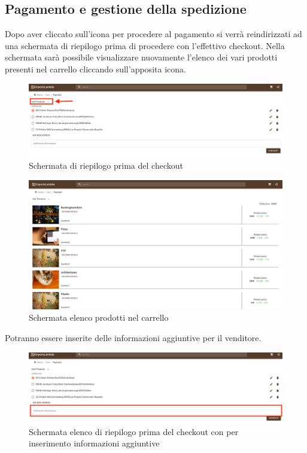 \subsection{Pagamento e gestione della spedizione}
Dopo aver cliccato sull'icona per procedere al pagamento si verrà reindirizzati ad una schermata di riepilogo prima di procedere con l'effettivo checkout.
Nella schermata sarà possibile visualizzare nuovamente l'elenco dei vari prodotti presenti nel carrello cliccando sull'apposita icona. 
\begin{figure}[H]
	\centering
	\includegraphics[scale=0.25]{Immagini/Acquirente/payment.cartproduct.png}
	\caption{Schermata di riepilogo prima del checkout}
	\label{fig:CartProduct}
\end{figure}
\begin{figure}[H]
	\centering
	\includegraphics[scale=0.25]{Immagini/Acquirente/payment-products-open.customer.png}
	\caption{Schermata elenco prodotti nel carrello}
	\label{fig:CartProductElenco}
\end{figure}
Potranno essere inserite delle informazioni aggiuntive per il venditore.
\begin{figure}[H]
	\centering
	\includegraphics[scale=0.25]{Immagini/Acquirente/payment.addinfo.png}
	\caption{Schermata elenco di riepilogo prima del checkout con  per inserimento informazioni aggiuntive}
	\label{fig:CartAddinfo}
\end{figure}
